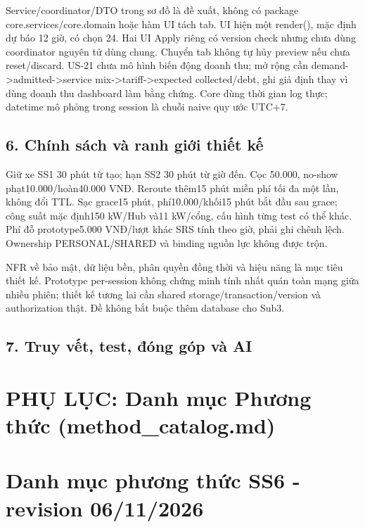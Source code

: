 \documentclass[11pt,a4paper]{article}
\begin{document}
Service/coordinator/DTO trong sơ đồ là đề xuất, không có package
core.services/core.domain hoặc hàm UI tách tab. UI hiện một render(),
mặc định dự báo 12 giờ, có chọn 24. Hai UI Apply riêng có version check
nhưng chưa dùng coordinator nguyên tử dùng chung. Chuyển tab không tự
hủy preview nếu chưa reset/discard. US-21 chưa mô hình biến động doanh
thu; mở rộng cần demand-\textgreater admitted-\textgreater service
mix-\textgreater tariff-\textgreater expected collected/debt, ghi giả
định thay vì dùng doanh thu dashboard làm bằng chứng. Core dùng thời
gian log thực; datetime mô phỏng trong session là chuỗi naive quy ước
UTC+7.

\hypertarget{chuxednh-suxe1ch-vuxe0-ranh-giux1edbi-thiux1ebft-kux1ebf}{%
\subsection{6. Chính sách và ranh giới thiết
kế}\label{chuxednh-suxe1ch-vuxe0-ranh-giux1edbi-thiux1ebft-kux1ebf}}

Giữ xe SS1 30 phút từ tạo; hạn SS2 30 phút từ giờ đến. Cọc 50.000,
no-show phạt10.000/hoàn40.000 VNĐ. Reroute thêm15 phút miễn phí tối đa
một lần, không đổi TTL. Sạc grace15 phút, phí10.000/khối15 phút bắt đầu
sau grace; công suất mặc định150 kW/Hub và11 kW/cổng, cấu hình từng test
có thể khác. Phí đỗ prototype5.000 VNĐ/lượt khác SRS tính theo giờ, phải
ghi chênh lệch. Ownership PERSONAL/SHARED và binding nguồn lực không
được trộn.

NFR về bảo mật, dữ liệu bền, phân quyền đồng thời và hiệu năng là mục
tiêu thiết kế. Prototype per-session không chứng minh tính nhất quán
toàn mạng giữa nhiều phiên; thiết kế tương lai cần shared
storage/transaction/version và authorization thật. Đề không bắt buộc
thêm database cho Sub3.

\hypertarget{truy-vux1ebft-test-ux111uxf3ng-guxf3p-vuxe0-ai}{%
\subsection{7. Truy vết, test, đóng góp và
AI}\label{truy-vux1ebft-test-ux111uxf3ng-guxf3p-vuxe0-ai}}

\newpage
\section*{PHỤ LỤC: Danh mục Phương thức (method\_catalog.md)}
\hypertarget{danh-mux1ee5c-phux1b0ux1a1ng-thux1ee9c-ss6---revision-06112026}{%
\section{Danh mục phương thức SS6 - revision
06/11/2026}\label{danh-mux1ee5c-phux1b0ux1a1ng-thux1ee9c-ss6---revision-06112026}}
\end{document}
